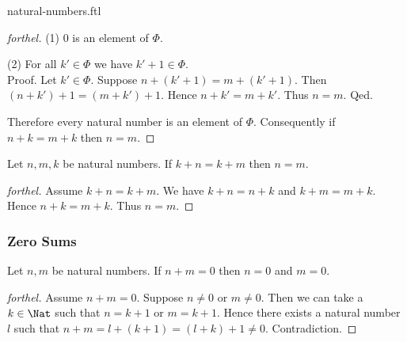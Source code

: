 \documentclass{naproche-library}
\begin{document}
\begin{smodule}{natural-numbers.ftl}
\begin{proof}[forthel]
    (1) $0$ is an element of $\Phi$.

    (2) For all $k' \in \Phi$ we have $k' + 1 \in \Phi$. \\
    Proof.
      Let $k' \in \Phi$.
      Suppose $n + (k' + 1) = m + (k' + 1)$.
      Then $(n + k') + 1 = (m + k') + 1$.
      Hence $n + k' = m + k'$.
      Thus $n = m$.
    Qed.

    Therefore every natural number is an element of $\Phi$.
    Consequently if $n + k = m + k$ then $n = m$.
  \end{proof}

  \begin{corollary}[forthel,id=ARITHMETIC_03_8445946379632640]
    Let $n, m, k$ be natural numbers.
    If $k + n = k + m$ then $n = m$.
  \end{corollary}
  \begin{proof}[forthel]
    Assume $k + n = k + m$.
    We have $k + n = n + k$ and $k + m = m + k$.
    Hence $n + k = m + k$.
    Thus $n = m$.
  \end{proof}


  \subsubsection*{Zero Sums}

  \begin{proposition}[forthel,id=ARITHMETIC_03_3520602170195968]
    Let $n, m$ be natural numbers.
    If $n + m = 0$ then $n = 0$ and $m = 0$.
  \end{proposition}
  \begin{proof}[forthel]
    Assume $n + m = 0$.
    Suppose $n \neq 0$ or $m \neq 0$.
    Then we can take a $k \in \Nat$ such that $n = k + 1$ or $m = k + 1$.
    Hence there exists a natural number $l$ such that
    $n + m
      = l + (k + 1)
      = (l + k) + 1
      \neq 0$.
    Contradiction.
  \end{proof}
\end{smodule}
\end{document}
